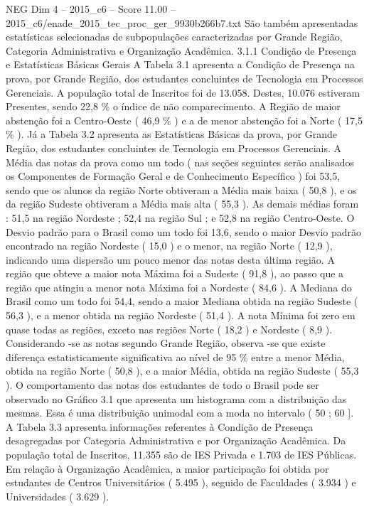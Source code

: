 \begin{textsample}{NEG Dim 4 – 2015\_c6 – Score 11.00 – 2015\_c6/enade\_2015\_tec\_proc\_ger\_9930b266b7.txt}
São também apresentadas estatísticas selecionadas de subpopulações caracterizadas por Grande Região, Categoria Administrativa e Organização Acadêmica. 3.1.1 Condição de Presença e Estatísticas Básicas Gerais A Tabela 3.1 apresenta a Condição de Presença na prova, por Grande Região, dos estudantes concluintes de Tecnologia em Processos Gerenciais.
A população total de Inscritos foi de 13.058.
Destes, 10.076 estiveram Presentes, sendo 22,8 \% o índice de não comparecimento.
A Região de maior abstenção foi a Centro-Oeste ( 46,9 \% ) e a de menor abstenção foi a Norte ( 17,5 \% ).
Já a Tabela 3.2 apresenta as Estatísticas Básicas da prova, por Grande Região, dos estudantes concluintes de Tecnologia em Processos Gerenciais.
A Média das notas da prova como um todo ( nas seções seguintes serão analisados os Componentes de Formação Geral e de Conhecimento Específico ) foi 53,5, sendo que os alunos da região Norte obtiveram a Média mais baixa ( 50,8 ), e os da região Sudeste obtiveram a Média mais alta ( 55,3 ).
As demais médias foram : 51,5 na região Nordeste ; 52,4 na região Sul ; e 52,8 na região Centro-Oeste.
O Desvio padrão para o Brasil como um todo foi 13,6, sendo o maior Desvio padrão encontrado na região Nordeste ( 15,0 ) e o menor, na região Norte ( 12,9 ), indicando uma dispersão um pouco menor das notas desta última região.
A região que obteve a maior nota Máxima foi a Sudeste ( 91,8 ), ao passo que a região que atingiu a menor nota Máxima foi a Nordeste ( 84,6 ).
A Mediana do Brasil como um todo foi 54,4, sendo a maior Mediana obtida na região Sudeste ( 56,3 ), e a menor obtida na região Nordeste ( 51,4 ).
A nota Mínima foi zero em quase todas as regiões, exceto nas regiões Norte ( 18,2 ) e Nordeste ( 8,9 ).
Considerando -se as notas segundo Grande Região, observa -se que existe diferença estatisticamente significativa ao nível de 95 \% entre a menor Média, obtida na região Norte ( 50,8 ), e a maior Média, obtida na região Sudeste ( 55,3 ).
O comportamento das notas dos estudantes de todo o Brasil pode ser observado no Gráfico 3.1 que apresenta um histograma com a distribuição das mesmas.
Essa é uma distribuição unimodal com a moda no intervalo ( 50 ; 60 ].
A Tabela 3.3 apresenta informações referentes à Condição de Presença desagregadas por Categoria Administrativa e por Organização Acadêmica.
Da população total de Inscritos, 11.355 são de IES Privada e 1.703 de IES Públicas.
Em relação à Organização Acadêmica, a maior participação foi obtida por estudantes de Centros Universitários ( 5.495 ), seguido de Faculdades ( 3.934 ) e Universidades ( 3.629 ).

\end{textsample}
